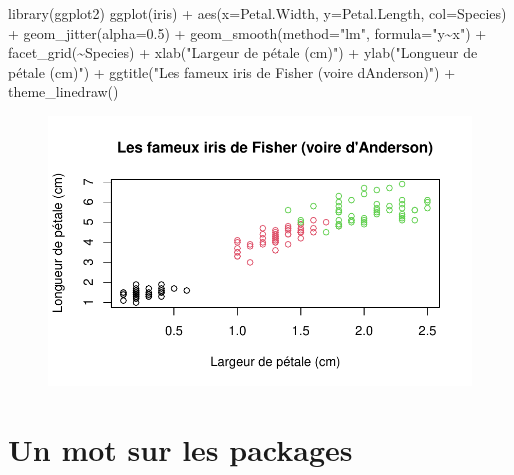 \documentclass[
  letterpaper,
  DIV=11,
  numbers=noendperiod]{scrreprt}
\newenvironment{Shaded}{\begin{snugshade}}{\end{snugshade}}
\newcommand{\AttributeTok}[1]{\textcolor[rgb]{0.40,0.45,0.13}{#1}}
\newcommand{\FloatTok}[1]{\textcolor[rgb]{0.68,0.00,0.00}{#1}}
\newcommand{\FunctionTok}[1]{\textcolor[rgb]{0.28,0.35,0.67}{#1}}
\newcommand{\NormalTok}[1]{\textcolor[rgb]{0.00,0.23,0.31}{#1}}
\newcommand{\SpecialCharTok}[1]{\textcolor[rgb]{0.37,0.37,0.37}{#1}}
\newcommand{\StringTok}[1]{\textcolor[rgb]{0.13,0.47,0.30}{#1}}
\begin{document}
\begin{Shaded}
\begin{Highlighting}[]
\FunctionTok{library}\NormalTok{(ggplot2)}
\FunctionTok{ggplot}\NormalTok{(iris) }\SpecialCharTok{+} 
  \FunctionTok{aes}\NormalTok{(}\AttributeTok{x=}\NormalTok{Petal.Width, }\AttributeTok{y=}\NormalTok{Petal.Length, }\AttributeTok{col=}\NormalTok{Species) }\SpecialCharTok{+} 
  \FunctionTok{geom\_jitter}\NormalTok{(}\AttributeTok{alpha=}\FloatTok{0.5}\NormalTok{) }\SpecialCharTok{+}
  \FunctionTok{geom\_smooth}\NormalTok{(}\AttributeTok{method=}\StringTok{"lm"}\NormalTok{, }\AttributeTok{formula=}\StringTok{"y\textasciitilde{}x"}\NormalTok{) }\SpecialCharTok{+}
  \FunctionTok{facet\_grid}\NormalTok{(}\SpecialCharTok{\textasciitilde{}}\NormalTok{Species) }\SpecialCharTok{+}
  \FunctionTok{xlab}\NormalTok{(}\StringTok{"Largeur de pétale (cm)"}\NormalTok{) }\SpecialCharTok{+} 
  \FunctionTok{ylab}\NormalTok{(}\StringTok{"Longueur de pétale (cm)"}\NormalTok{) }\SpecialCharTok{+}
  \FunctionTok{ggtitle}\NormalTok{(}\StringTok{"Les fameux iris de Fisher (voire d\textquotesingle{}Anderson)"}\NormalTok{) }\SpecialCharTok{+}
  \FunctionTok{theme\_linedraw}\NormalTok{()}
\end{Highlighting}
\end{Shaded}

\begin{figure}[H]

{\centering \includegraphics{premiers-pas_files/figure-pdf/unnamed-chunk-63-1.pdf}

}

\end{figure}

\hypertarget{un-mot-sur-les-packages}{%
\section{Un mot sur les packages}\label{un-mot-sur-les-packages}}
\end{document}
